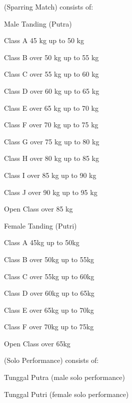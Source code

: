 \begin{legal}
\item {} (Sparring Match) consists of:
    \begin{legal}
    \item Male Tanding (Putra)
        \begin{legal}
            \item Class A 45 kg up to 50 kg
            \item Class B over 50 kg up to 55 kg
            \item Class C over 55 kg up to 60 kg
            \item Class D over 60 kg up to 65 kg
            \item Class E over 65 kg up to 70 kg
            \item Class F over 70 kg up to 75 kg
            \item Class G over 75 kg up to 80 kg
            \item Class H over 80 kg up to 85 kg
            \item Class I over 85 kg up to 90 kg
            \item Class J over 90 kg up to 95 kg
            \item Open Class over 85 kg
        \end{legal}
    \item Female Tanding (Putri)
        \begin{legal}
            \item Class A 45kg up to 50kg
            \item Class B over 50kg up to 55kg
            \item Class C over 55kg up to 60kg
            \item Class  D over 60kg up to 65kg
            \item Class E over 65kg up to 70kg
            \item Class  F over 70kg up to 75kg
            \item Open Class over 65kg
        \end{legal}
    \item {} (Solo Performance) consists of:
        \begin{legal}
        \item Tunggal Putra (male solo performance)
        \item Tunggal Putri (female solo performance)
        \end{legal}


\end{legal}
\end{legal}
